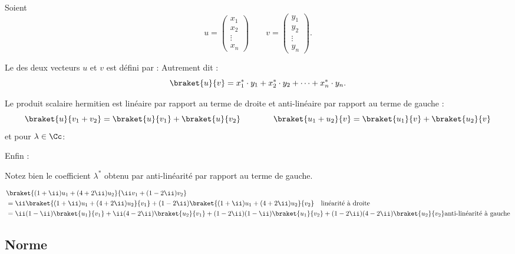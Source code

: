 \documentclass[11pt,class=report,crop=false]{standalone}
\begin{document}
Soient $$u = \begin{pmatrix}x_1\\x_2\\\vdots\\x_n\end{pmatrix} \qquad 
v = \begin{pmatrix}y_1\\y_2\\\vdots\\y_n\end{pmatrix}.$$

Le  des deux vecteurs $u$ et $v$ est défini par :
Autrement dit :
$$\braket{u}{v} = x_1^* \cdot y_1 + x_2^* \cdot y_2 + \cdots + x_n^* \cdot y_n.$$

\begin{proposition}
Le produit scalaire hermitien est linéaire par rapport au terme de droite et anti-linéaire par rapport au terme de gauche :
$$\braket{u}{v_1 + v_2} = \braket{u}{v_1} + 
\braket{u}{v_2}
\qquad\qquad
\braket{u_1 + u_2}{v} = \braket{u_1}{v} + 
\braket{u_2}{v}$$
et pour $\lambda \in \Cc$:

Enfin :
\end{proposition}

Notez bien le coefficient $\lambda^*$ obtenu par anti-linéarité par rapport au terme de gauche.
\begin{exemple}
\begin{align*}
& \braket{(1+\ii)u_1 + (4+2\ii) u_2}{ \ii v_1 + (1-2\ii) v_2}  \\
  &=  
\ii\braket{(1+\ii)u_1 + (4+2\ii) u_2}{ v_1}
+(1-2\ii)\braket{(1+\ii)u_1 + (4+2\ii) u_2}{v_2} \quad \text{linéarité à droite} \\
  &=  
\ii(1-\ii)\braket{u_1}{v_1}
+\ii(4-2\ii)\braket{u_2}{v_1}
+(1-2\ii)(1-\ii)\braket{u_1}{v_2}
+(1-2\ii)(4-2\ii)\braket{u_2}{v_2}
\text{anti-linéarité à gauche} \\
\end{align*}
\end{exemple}

\subsection{Norme}
\end{document}
